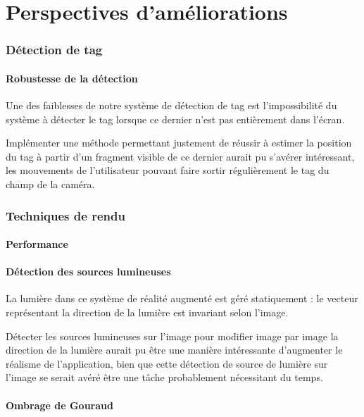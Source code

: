 \part{Perspectives d'améliorations}

\section{Détection de tag}

    \subsection{Robustesse de la détection}

    Une des faiblesses de notre système de détection de tag est l'impossibilité du système à détecter le tag lorsque ce dernier n'est pas entièrement dans l'écran.

    Implémenter une méthode permettant justement de réussir à estimer la position du tag à partir d'un fragment visible de ce dernier aurait pu s'avérer intéressant, les mouvements de l'utilisateur pouvant faire sortir régulièrement le tag du champ de la caméra.

\section{Techniques de rendu}

    \subsection{Performance}


    \subsection{Détection des sources lumineuses}

    La lumière dans ce système de réalité augmenté est géré statiquement : le vecteur représentant la direction de la lumière est invariant selon l'image.

    Détecter les sources lumineuses sur l'image pour modifier image par image la direction de la lumière aurait pu être une manière intéressante d'augmenter le réalisme de l'application, bien que cette détection de source de lumière sur l'image se serait avéré être une tâche probablement nécessitant du temps.

    \subsection{Ombrage de Gouraud}

